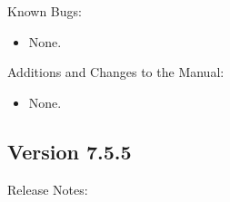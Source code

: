 \noindent Known Bugs:

\begin{itemize}

\item None.

\end{itemize}

\noindent Additions and Changes to the Manual:

\begin{itemize}

\item None.

\end{itemize}


\subsection*{\label{sec:New-7-5-5}Version 7.5.5}

\noindent Release Notes:

